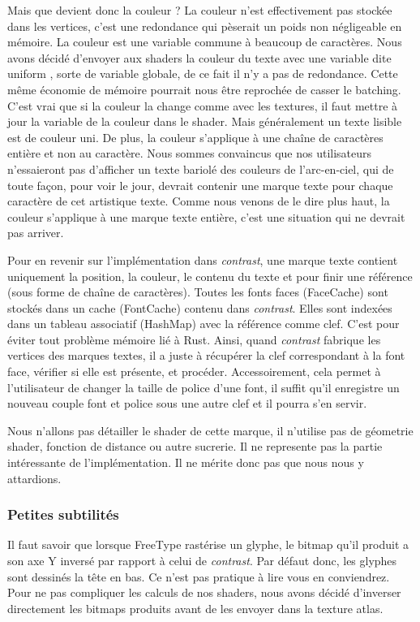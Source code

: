 \documentclass[12pt]{article}
\begin{document}
Mais que devient donc la couleur ? La couleur n'est effectivement pas stockée dans les vertices, c'est une redondance qui pèserait un poids non négligeable en mémoire. La couleur est une variable
commune à beaucoup de caractères. Nous avons décidé d'envoyer aux shaders la couleur du texte avec une variable dite \og uniform \fg{}, sorte de variable globale, de ce fait il n'y a pas de redondance.
Cette même économie de mémoire pourrait nous être reprochée de casser le batching. C'est vrai que si la couleur la change comme avec les textures, il faut mettre à jour la variable de la couleur
dans le shader. Mais généralement un texte lisible est de couleur uni. De plus, la couleur s'applique à une chaîne de caractères entière et non au caractère. Nous sommes convaincus que nos utilisateurs
n'essaieront pas d'afficher un texte bariolé des couleurs de l'arc-en-ciel, qui de toute façon, pour voir le jour, devrait contenir une marque texte pour chaque caractère de cet artistique texte.
Comme nous venons de le dire plus haut, la couleur s'applique à une marque texte entière, c'est une situation qui ne devrait pas arriver.

Pour en revenir sur l'implémentation dans \textit{contrast}, une marque texte contient uniquement la position, la couleur, le contenu du texte et pour finir une référence (sous forme
de chaîne de caractères). Toutes les fonts faces (FaceCache) sont stockés dans un cache (FontCache) contenu dans \textit{contrast}. Elles sont indexées dans un tableau associatif (HashMap) avec la référence
comme clef. C'est pour éviter tout problème mémoire lié à Rust. Ainsi, quand \textit{contrast} fabrique les vertices des marques textes, il a juste à récupérer la clef correspondant à la font face,
vérifier si elle est présente, et procéder. Accessoirement, cela permet à l'utilisateur de changer la taille de police d'une font, il suffit qu'il enregistre un nouveau couple font et police
sous une autre clef et il pourra s'en servir.

Nous n'allons pas détailler le shader de cette marque, il n'utilise pas de géometrie shader, fonction de distance ou autre sucrerie.
Il ne represente pas la partie intéressante de l'implémentation. Il ne mérite donc pas que nous nous y attardions.

\subsubsection{Petites subtilités}

Il faut savoir que lorsque FreeType rastérise un glyphe, le bitmap qu'il produit a son axe Y inversé par rapport à celui de \textit{contrast}. Par défaut donc, les glyphes sont dessinés la tête en bas.
Ce n'est pas pratique à lire vous en conviendrez. Pour ne pas compliquer les calculs de nos shaders, nous avons décidé d'inverser directement les bitmaps produits avant de les envoyer
dans la texture atlas.
\end{document}
